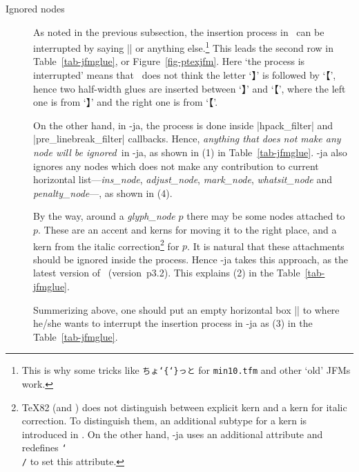 \documentclass{ajt}
\begin{document}
\begin{description}
\item[Ignored nodes]
As noted in the previous subsection, the insertion process in \pTeX\ can
	   be interrupted by saying |{}| or anything else.\footnote{This
	   is why some tricks like \texttt{ちょ\char`\{\char`\}っと} for
	   \texttt{min10.tfm} and other `old' JFMs work.} This leads the
	   second row in Table~\ref{tab-jfmglue}, or
	   Figure~\ref{fig-ptexjfm}. Here `the process is interrupted'
	   means that \pTeX\ does not think the letter `】\inhibitglue'
	   is followed by `\inhibitglue【', hence two half-width glues
	   are inserted between `】\inhibitglue' and `\inhibitglue【',
	   where the left one is from `】\inhibitglue' and the right one
	   is from `\inhibitglue【'.

	   On the other hand, in \LuaTeX-ja, the process is done inside
	   |hpack_filter| and |pre_linebreak_filter| callbacks. Hence,
	   \emph{anything that does not make any node will be
	   ignored}\ in \LuaTeX-ja, as shown in (1) in
	   Table~\ref{tab-jfmglue}. \LuaTeX-ja also ignores any nodes
	   which does not make any contribution to current horizontal
	   list---\emph{ins\_node}, \emph{adjust\_node},
	   \emph{mark\_node}, \emph{whatsit\_node} and
	   \emph{penalty\_node}---, as shown in (4).


By the way, around a \emph{glyph\_node} $p$ there may be some nodes
	   attached to~$p$. These are an accent and kerns for
	   moving it to the right place, and a kern from the italic
	   correction\footnote{\TeX82 (and \LuaTeX) does not distinguish
	   between explicit kern and a kern for italic correction. To
	   distinguish them, an additional subtype for a kern is introduced
	   in \pTeX. On the other hand, \LuaTeX-ja uses an additional attribute and
	   redefines \texttt{\char`\\/} to set this attribute.} for $p$. It is natural that
	   these attachments should be ignored inside the process. Hence
	   \LuaTeX-ja takes this approach, as the latest version of
	   \pTeX\ (version~p3.2). This explains (2) in the Table~\ref{tab-jfmglue}.

Summerizing above, one should put an empty horizontal box |\hbox{}| to
	   where he/she wants to interrupt the insertion process in
	   \LuaTeX-ja as (3) in the Table~\ref{tab-jfmglue}.


\end{description}
\end{document}
